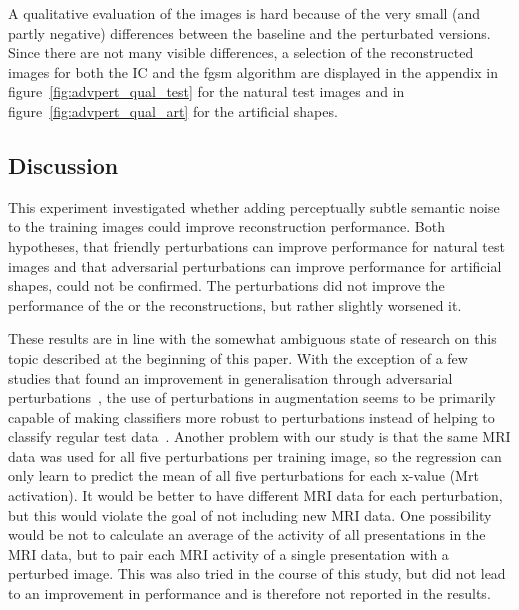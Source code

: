 A qualitative evaluation of the images is hard because of the very small (and partly negative) differences between the baseline and the perturbated versions. Since there are not many visible differences, a selection of the reconstructed images for both the IC and the fgsm algorithm are displayed in the appendix in figure~\ref{fig:advpert_qual_test} for the natural test images and in figure~\ref{fig:advpert_qual_art} for the artificial shapes.


\subsection{Discussion}
This experiment investigated whether adding perceptually subtle semantic noise to the training images could improve reconstruction performance. Both hypotheses, that friendly perturbations can improve performance for natural test images and that adversarial perturbations can improve performance for artificial shapes, could not be confirmed. The perturbations did not improve the performance of the  or the reconstructions, but rather slightly worsened it. 

These results are in line with the somewhat ambiguous state of research on this topic described at the beginning of this paper. With the exception of a few studies that found an improvement in generalisation through adversarial perturbations~\cite{xieAdversarialExamplesImprove2020,yanEnhancingClassificationPerformance2023}, the use of perturbations in augmentation seems to be primarily capable of making classifiers more robust to perturbations instead of helping to classify regular test data~\cite{goodfellowExplainingHarnessingAdversarial2014,madryDeepLearningModels2019}. Another problem with our study is that the same MRI data was used for all five perturbations per training image, so the regression can only learn to predict the mean of all five perturbations for each x-value (Mrt activation). It would be better to have different MRI data for each perturbation, but this would violate the goal of not including new MRI data. One possibility would be not to calculate an average of the activity of all presentations in the MRI data, but to pair each MRI activity of a single presentation with a perturbed image. This was also tried in the course of this study, but did not lead to an improvement in performance and is therefore not reported in the results. 

